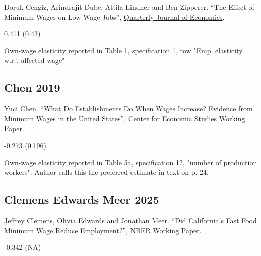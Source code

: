 \noindent Doruk Cengiz, Arindrajit Dube, Attila Lindner and Ben Zipperer. ``The Effect of Minimum Wages on Low-Wage Jobs'', \href{https://doi.org/10.1093/qje/qjz014}{Quarterly Journal of Economics}.

\vspace{0.7em}

 0.411 (0.43)

\vspace{0.7em}

 Own-wage elasticity reported in Table 1, specification 1, row "Emp. elasticity w.r.t affected wage"

\subsection*{Chen 2019}
\vspace{-0.7em}

\noindent Yuci Chen. ``What Do Establishments Do When Wages Increase? Evidence from Minimum Wages in the United States'', \href{https://www2.census.gov/ces/wp/2019/CES-WP-19-31.pdf}{Center for Economic Studies Working Paper}.

\vspace{0.7em}

 -0.273 (0.196)

\vspace{0.7em}

 Own-wage elasticity reported in Table 5a, specification 12, "number of production workers". Author calls this the preferred estimate in text on p. 24.

\subsection*{Clemens Edwards Meer 2025}
\vspace{-0.7em}

\noindent Jeffrey Clemens, Olivia Edwards and Jonathan Meer. ``Did California's Fast Food Minimum Wage Reduce Employment?'', \href{https://www.nber.org/system/files/working_papers/w34033/w34033.pdf}{NBER Working Paper}.

\vspace{0.7em}

 -0.342 (NA)

\vspace{0.7em}

